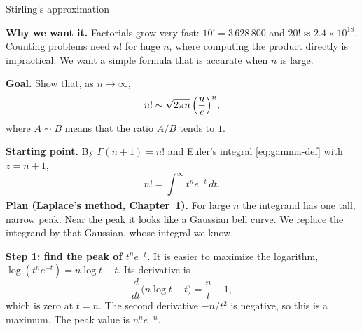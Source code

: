 \documentclass[11pt]{beamer}
\begin{document}
\begin{frame}[allowframebreaks=1.00]{Stirling's approximation}
\footnotesize

\textbf{Why we want it.} Factorials grow very fast: \(10!=3\,628\,800\) and
\(20!\approx2.4\times10^{18}\). Counting problems need \(n!\) for huge \(n\), where computing the product directly is impractical. We
want a simple formula that is accurate when \(n\) is large.

\textbf{Goal.} Show that, as \(n\to\infty\),
\[
  n!\sim\sqrt{2\pi n}\,\Bigl(\frac ne\Bigr)^n,
\]
where \(A\sim B\) means that the ratio \(A/B\) tends to \(1\).

\textbf{Starting point.} By \(\Gamma(n+1)=n!\) and Euler's integral \eqref{eq:gamma-def} with
\(z=n+1\),
\[
  n!=\int_0^\infty t^n e^{-t}\,dt .
\]
\textbf{Plan (Laplace's method, Chapter~1).} For large \(n\) the integrand has one tall, narrow
peak. Near the peak it looks like a Gaussian bell curve. We replace the integrand by that Gaussian,
whose integral we know.
\par\framebreak\par
\textbf{Step 1: find the peak of \(t^ne^{-t}\).} It is easier to maximize the logarithm,
\(\log(t^ne^{-t})=n\log t-t\). Its derivative is
\[
  \frac{d}{dt}\bigl(n\log t-t\bigr)=\frac nt-1,
\]
which is zero at \(t=n\). The second derivative \(-n/t^2\) is negative, so this is a maximum. The
peak value is \(n^ne^{-n}\).


\end{frame}
\end{document}
